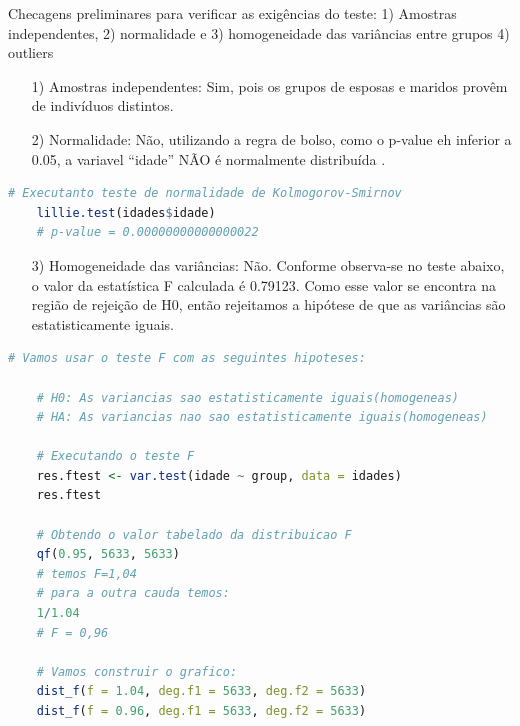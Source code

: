 Checagens preliminares para verificar as exigências do teste: 1) Amostras independentes, 2) normalidade e 3) homogeneidade das variâncias entre grupos 4) outliers


\begin{enumerate}
    \item[1)] Amostras independentes: Sim, pois os grupos de esposas e maridos provêm de indivíduos distintos.
\end{enumerate}

\begin{enumerate}
    \item[2)] Normalidade: Não, utilizando a regra de bolso, como o p-value eh inferior a 0.05, a variavel ``idade'' NÃO é normalmente distribuída .
\end{enumerate}
\begin{lstlisting}[language=R, style=input] 
    # Executanto teste de normalidade de Kolmogorov-Smirnov
    lillie.test(idades$idade)  
    # p-value = 0.00000000000000022
\end{lstlisting}

\begin{enumerate}
    \item[3)] Homogeneidade das variâncias: Não. Conforme observa-se no teste abaixo, o valor da estatística F calculada é 0.79123. Como esse valor se encontra na região de rejeição de H0, então rejeitamos a hipótese de que as variâncias são estatisticamente iguais. 
\end{enumerate}
\begin{lstlisting}[language=R, style=input] 
     # Vamos usar o teste F com as seguintes hipoteses:
    
    # H0: As variancias sao estatisticamente iguais(homogeneas)
    # HA: As variancias nao sao estatisticamente iguais(homogeneas)
    
    # Executando o teste F 
    res.ftest <- var.test(idade ~ group, data = idades)
    res.ftest
    
    # Obtendo o valor tabelado da distribuicao F
    qf(0.95, 5633, 5633)
    # temos F=1,04
    # para a outra cauda temos:
    1/1.04
    # F = 0,96
    
    # Vamos construir o grafico:
    dist_f(f = 1.04, deg.f1 = 5633, deg.f2 = 5633)
    dist_f(f = 0.96, deg.f1 = 5633, deg.f2 = 5633)  
\end{lstlisting}

